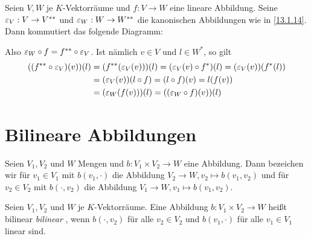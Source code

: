 \documentclass[../../main.tex]{subfiles}
\begin{document}
\begin{bem}\label{13.1.15}
	Seien $V,W$ je $K$-Vektorräume und $f: V\to W$ eine lineare Abbildung. Seine $\varepsilon_V: V\to V^{**}$ und $\varepsilon_W: W\to W^{**}$ die kanonischen Abbildungen wie in \ref{13.1.14}. Dann kommutiert das folgende Diagramm:
	\begin{center}
	\end{center}
	Also $\varepsilon_W\circ f= f^{**}\circ \varepsilon_V$. Ist nämlich $v \in V$ und $l\in W^*$, so gilt
	\begin{align*}
		((f^{**}\circ \varepsilon_V)(v))(l)&=(f^{**}(\varepsilon_V(v)))(l)=(\varepsilon_V(v)\circ f^*)(l)=(\varepsilon_V(v))(f^*(l))\\
		&=(\varepsilon_V(v))(l\circ f)=(l\circ f)(v)=l(f(v))\\
		&=(\varepsilon_W(f(v)))(l)=((\varepsilon_W\circ f)(v))(l)
	\end{align*}
\end{bem}


\section{Bilineare Abbildungen}
\begin{df}\label{13.2.1}
	Seien $V_1,V_2$ und $W$ Mengen und $b: V_1\times V_2\to W$ eine Abbildung. Dann bezeichen wir für $v_1\in V_1$ mit $b(v_1,\cdot)$ die Abbildung $V_2\to W, v_2\mapsto b(v_1,v_2)$ und für $v_2\in V_2$ mit $b(\cdot,v_2)$ die Abbildung $V_1\to W, v_1\mapsto b(v_1,v_2)$.
\end{df}	

\begin{df}\label{13.2.2}
	Seien $V_1,V_2$ und $W$ je $K$-Vektorräume. Eine Abbildung $b: V_1\times V_2\to W$ heißt bilinear \emph{bilinear} , wenn $b(\cdot,v_2)$ für alle $v_2\in V_2$ und $b(v_1,\cdot)$ für alle $v_1\in V_1$ linear sind.
\end{df}
	
\end{document}
